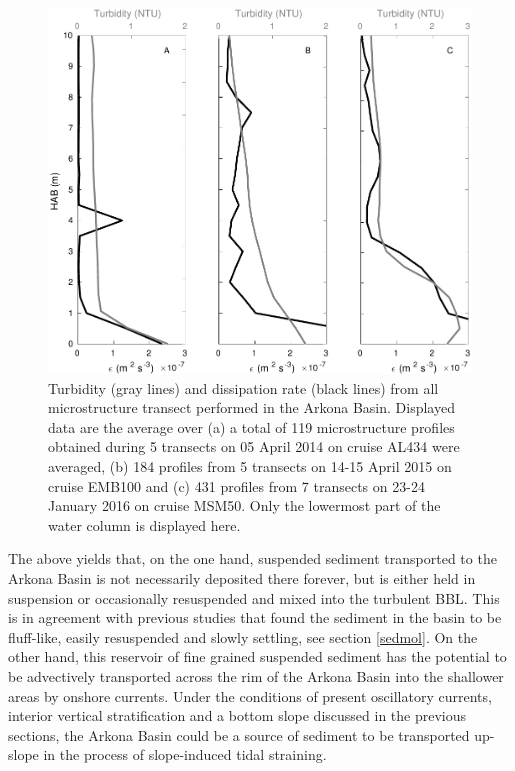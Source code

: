    \begin{figure}[ht]
\includegraphics[width=15cm]{bilder/arkona_mss.pdf}
 \caption{Turbidity (gray lines) and dissipation rate (black lines) from all 
microstructure transect performed in the Arkona Basin. Displayed data are the 
average over (a) a total of 119 microstructure profiles obtained during 5 
transects on 05 April 2014 on cruise AL434 were averaged, (b) 184 profiles from 
5 transects on 14-15 April 2015 on cruise EMB100 and (c) 431 profiles from 7 
transects on 23-24 January 2016 on cruise MSM50. Only the lowermost part of 
the water column is displayed here.}
 \label{abmss}
 \end{figure}

The above yields that, on the one hand, suspended sediment transported to the 
Arkona Basin is not necessarily deposited there forever, but is either held in 
suspension or occasionally resuspended and mixed into the turbulent BBL. This 
is in agreement with previous studies that found the sediment in the basin to 
be fluff-like, easily resuspended and slowly settling, see section 
\ref{sedmol}. On the other hand, this reservoir of fine grained 
suspended sediment has the potential to be advectively 
transported across the rim of the Arkona Basin into the shallower areas by 
onshore currents. Under the conditions of present oscillatory currents, 
interior vertical stratification and a bottom slope discussed in the previous 
sections, the Arkona Basin could be a source of sediment to be transported 
up-slope in the process of slope-induced tidal straining.

